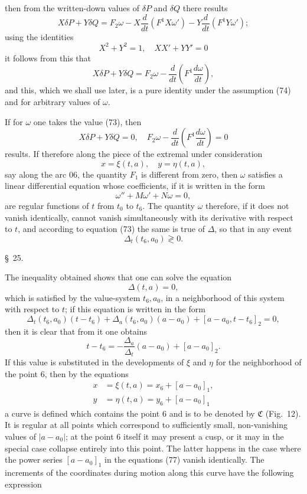 \documentclass[11pt,a4paper,leqno]{article}
\begin{document}
then from the written-down values of $\delta P$ and $\delta Q$ there results
\[
X\delta P+Y\delta Q
=F_2\omega-X\frac{d}{dt}(F^1X\omega')-Y\frac{d}{dt}(F^1Y\omega');
\]
using the identities
\[
X^2+Y^2=1,
\quad
XX'+YY'=0
\]
it follows from this that
\begin{equation}\tag{75}
X\delta P+Y\delta Q=F_2\omega-\frac{d}{dt}\left(F^1\frac{d\omega}{dt}\right),
\end{equation}
and this, which we shall use later, is a pure identity under the assumption (74) and for arbitrary values of $\omega$.

If for $\omega$ one takes the value (73), then
\[
X\delta P+Y\delta Q=0,
\quad
F_2\omega-\frac{d}{dt}\left(F^1\frac{d\omega}{dt}\right)=0
\]
results. If therefore along the piece of the extremal under consideration
\[
x=\xi(t,a),\quad y=\eta(t,a),
\]
say along the arc 06, the quantity $F_1$ is different from zero, then $\omega$ satisfies a linear differential equation whose coefficients, if it is written in the form
\[
\omega''+M\omega'+N\omega=0,
\]
are regular functions of $t$ from $t_0$ to $t_6$. The quantity $\omega$ therefore, if it does not vanish identically, cannot vanish simultaneously with its derivative with respect to $t$, and according to equation (73) the same is true of $\Delta$, so that in any event
\[
\Delta_t(t_6,a_0)\gtrless0.
\]

\begin{center}{\large \S~25.}\end{center}

The inequality obtained shows that one can solve the equation
\begin{equation}\tag{76}
\Delta(t,a)=0,
\end{equation}
which is satisfied by the value-system $t_6,a_0$, in a neighborhood of this system with respect to $t$; if this equation is written in the form
\[
\Delta_t(t_6,a_0)(t-t_6)+\Delta_a(t_6,a_0)(a-a_0)+[a-a_0,t-t_6]_2=0,
\]
then it is clear that from it one obtains
\[
t-t_6=-\frac{\Delta_a}{\Delta_t}(a-a_0)+[a-a_0]_2.
\]
If this value is substituted in the developments of $\xi$ and $\eta$ for the neighborhood of the point 6, then by the equations
\begin{equation}\tag{77}
\begin{aligned}
x&=\xi(t,a)=x_6+[a-a_0]_1,\\
y&=\eta(t,a)=y_6+[a-a_0]_1
\end{aligned}
\end{equation}
a curve is defined which contains the point 6 and is to be denoted by $\mathfrak{C}$ (Fig.~12). It is regular at all points which correspond to sufficiently small, non-vanishing values of $|a-a_0|$; at the point 6 itself it may present a cusp, or it may in the special case collapse entirely into this point. The latter happens in the case where the power series $[a-a_0]_1$ in the equations (77) vanish identically. The increments of the coordinates during motion along this curve have the following expression
\end{document}
